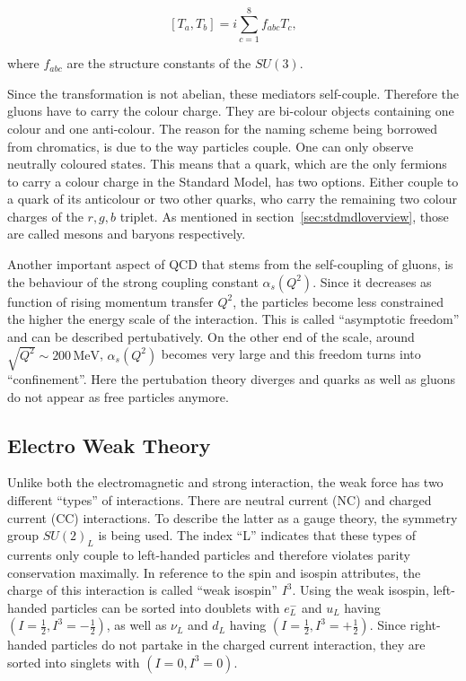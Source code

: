 \begin{equation}
  \label{eq:qcdgencommute}
  \left[ T_a, T_b \right] = i \sum_{c=1}^8 f_{abc} T_c,
\end{equation}

\noindent where $f_{abc}$ are the structure constants of the $SU(3)$. 

Since the transformation is not abelian, these mediators self-couple. Therefore the gluons have to carry the colour charge. They are bi-colour objects containing one colour and one anti-colour. The reason for the naming scheme being borrowed from chromatics, is due to the way particles couple. One can only observe neutrally coloured states. This means that a quark, which are the only fermions to carry a colour charge in the Standard Model, has two options. Either couple to a quark of its anticolour or two other quarks, who carry the remaining two colour charges of the $r,g,b$ triplet. As mentioned in section~\ref{sec:stdmdloverview}, those are called mesons and baryons respectively.

Another important aspect of QCD that stems from the self-coupling of gluons, is the behaviour of the strong coupling constant $\alpha_s(Q^2)$. Since it decreases as function of rising momentum transfer $Q^2$, the particles become less constrained the higher the energy scale of the interaction. This is called ``asymptotic freedom'' and can be described pertubatively. On the other end of the scale, around $\sqrt{Q^2} \sim 200\,\text{MeV}$, $\alpha_s(Q^2)$ becomes very large and this freedom turns into ``confinement''. Here the pertubation theory diverges and quarks as well as gluons do not appear as free particles anymore.

\subsection{Electro Weak Theory}

Unlike both the electromagnetic and strong interaction, the weak force has two different ``types'' of interactions. There are neutral current (NC) and charged current (CC) interactions. To describe the latter as a gauge theory, the symmetry group $SU(2)_L$ is being used. The index ``L'' indicates that these types of currents only couple to left-handed particles and therefore violates parity conservation maximally. In reference to the spin and isospin attributes, the charge of this interaction is called ``weak isospin'' $I^3$. Using the weak isospin, left-handed particles can be sorted into doublets with $e^-_L$ and $u_L$ having $(I = \frac{1}{2}, I^3 = -\frac{1}{2})$, as well as $\nu_L$ and $d_L$ having $(I = \frac{1}{2}, I^3 = +\frac{1}{2})$. Since right-handed particles do not partake in the charged current interaction, they are sorted into singlets with $(I = 0, I^3 = 0)$.

